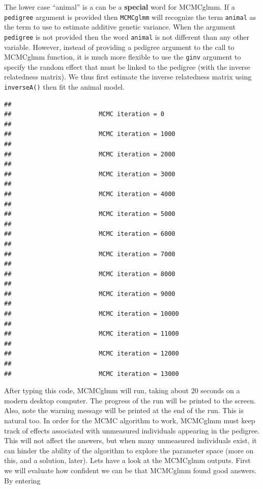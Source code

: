 \documentclass[
  12pt,
]{book}
\newenvironment{Shaded}{\begin{snugshade}}{\end{snugshade}}
\newcommand{\DataTypeTok}[1]{\textcolor[rgb]{0.13,0.29,0.53}{#1}}
\newcommand{\DecValTok}[1]{\textcolor[rgb]{0.00,0.00,0.81}{#1}}
\newcommand{\FloatTok}[1]{\textcolor[rgb]{0.00,0.00,0.81}{#1}}
\newcommand{\KeywordTok}[1]{\textcolor[rgb]{0.13,0.29,0.53}{\textbf{#1}}}
\newcommand{\NormalTok}[1]{#1}
\newcommand{\OperatorTok}[1]{\textcolor[rgb]{0.81,0.36,0.00}{\textbf{#1}}}
\newcommand{\StringTok}[1]{\textcolor[rgb]{0.31,0.60,0.02}{#1}}
\begin{document}
The lower case ``animal'' is a can be a \textbf{special} word for MCMCglmm. If a \texttt{pedigree} argument is provided then \texttt{MCMCglmm} will recognize the term \texttt{animal} as the term to use to estimate additive genetic variance. When the argument \texttt{pedigree} is not provided then the word \texttt{animal} is not different than any other variable. However, instead of providing a pedigree argument to the call to MCMCglmm function, it is much more flexible to use the \texttt{ginv} argument to specify the random effect that must be linked to the pedigree (with the inverse relatedness matrix). We thus first estimate the inverse relatedness matrix using \texttt{inverseA()} then fit the animal model.

\begin{Shaded}
\end{Shaded}

\begin{verbatim}
## 
##                        MCMC iteration = 0
## 
##                        MCMC iteration = 1000
## 
##                        MCMC iteration = 2000
## 
##                        MCMC iteration = 3000
## 
##                        MCMC iteration = 4000
## 
##                        MCMC iteration = 5000
## 
##                        MCMC iteration = 6000
## 
##                        MCMC iteration = 7000
## 
##                        MCMC iteration = 8000
## 
##                        MCMC iteration = 9000
## 
##                        MCMC iteration = 10000
## 
##                        MCMC iteration = 11000
## 
##                        MCMC iteration = 12000
## 
##                        MCMC iteration = 13000
\end{verbatim}

After typing this code, MCMCglmm will run, taking about 20 seconds on a modern desktop computer. The progress of the run will be printed to the screen. Also, note the warning message will be printed at the end of the run. This is natural too. In order for the MCMC algorithm to work, MCMCglmm must keep track of effects associated with unmeasured individuals appearing in the pedigree. This will not affect the answers, but when many unmeasured individuals exist, it can hinder the ability of the algorithm to explore the parameter space (more on this, and a solution, later). Lets have a look at the MCMCglmm outputs. First we will evaluate how confident we can be that MCMCglmm found good answers. By entering
\end{document}

